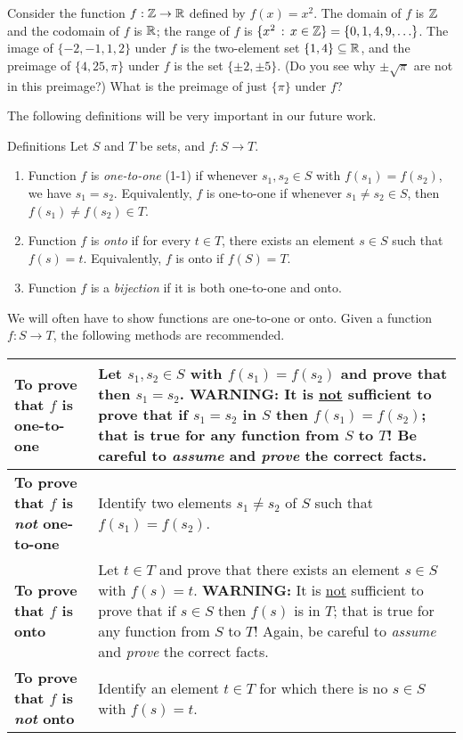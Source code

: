 \begin{example}{} Consider the function $f: \mathbb{Z} \to \mathbb{R}$ defined by $f(x)=x^2$.
The domain of $f$ is $\mathbb{Z}$ and the codomain of $f$ is $\mathbb{R}$; the
range of $f$ is $\{x^2\,:\,x\in \mathbb{Z}\}=\{0,1,4,9,\ldots\}$. The image
of $\{-2,-1,1,2\}$ under $f$ is the two-element set $\{1,4\} \subseteq
\mathbb{R}$, and the preimage of $\{4,25,\pi\}$ under $f$ is the set
$\{\pm 2, \pm 5\}$. (Do you see why $\pm \sqrt{\pi}$ are not in this
preimage?) What is the preimage of just $\{\pi\}$ under $f$? \end{example}


The following definitions will be very important in our future work.


\begin{df}{Definitions} Let $S$ and $T$ be sets, and $f:S\to T$.
\begin{enumerate}
\item Function $f$ is \textit{one-to-one} (1-1) if whenever $s_1, s_2\in S$ with $f(s_1)=f(s_2)$, we have $s_1=s_2$.  Equivalently, $f$ is one-to-one if
whenever $s_1\neq s_2 \in S$, then $f(s_1)\neq f(s_2) \in T$.
\item Function $f$ is \textit{onto} if for every $t\in T$, there exists an element $s\in S$ such that $f(s)=t$.  Equivalently, $f$ is onto if $f(S)=T$.
\item Function $f$ is a \textit{bijection} if it is both one-to-one and onto.
\end{enumerate}
\end{df}

We will often have to show functions are one-to-one or onto.  Given a function $f:S\to T$, the following methods are recommended.

\begin{center}
\renewcommand{\arraystretch}{1.3}
\begin{tabular}{|l|p{5cm}|}
\hline
\textbf{To prove that $f$ is one-to-one}& Let $s_1,s_2 \in S$ with $f(s_1)=f(s_2)$ and prove that then $s_1=s_2$.  {\bf WARNING:} It is \underline{not} sufficient to prove that if $s_1=s_2$ in $S$ then $f(s_1)=f(s_2)$; that is true for any function from $S$ to $T$!  Be careful to \textit{assume} and \textit{prove} the correct facts.\\
\hline
\textbf{To prove that $f$ is \textit{not} one-to-one}& Identify two elements $s_1 \neq s_2$ of $S$ such that $f(s_1)=f(s_2)$.\\
\hline
\textbf{To prove that $f$ is onto}& Let $t\in T$ and prove that there exists an element $s\in S$ with $f(s)=t$. {\bf WARNING:} It is \underline{not} sufficient to prove that if $s\in S$ then $f(s)$ is in $T$; that is true for any function from $S$ to $T$!  Again, be careful to \textit{assume} and \textit{prove} the correct facts.\\
\hline
\textbf{To prove that $f$ is \textit{not} onto}& Identify an element $t\in T$ for which there is no $s\in S$ with $f(s)=t$.\\
\hline
\end{tabular}
\end{center}
\smallskip

